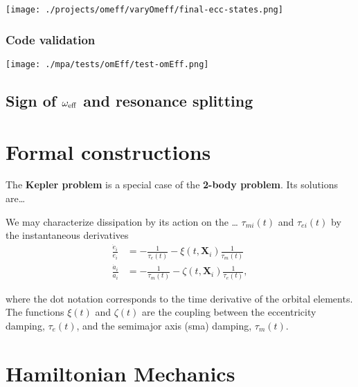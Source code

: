\documentclass[11pt]{article}
\begin{document}
\begin{center}
\texttt{[image: ./projects/omeff/varyOmeff/final-ecc-states.png]}
\end{center}

\subsubsection{Code validation}
\label{sec:org2dc94ff}
\begin{center}
\texttt{[image: ./mpa/tests/omEff/test-omEff.png]}
\end{center}


\subsection{Sign of \(\omega_{\rm eff}\) and resonance splitting}
\label{sec:org176ceb6}

\section{Formal constructions}
\label{sec:orgdb963f4}
The \textbf{Kepler problem} is a special case of the \textbf{2-body problem}.
Its solutions are\ldots{}

We may characterize dissipation by its action on the \ldots{}
\(\tau_{mi}(t)\) and \(\tau_{ei}(t)\) by the instantaneous derivatives
\begin{align}
   \frac{\dot e_i}{e_i} &= - \frac{1}{\tau_e(t)} - \xi(t, \mathbf X_i)\frac{1}{\tau_m(t)} \\
   \frac{\dot a_i}{a_i} &= -\frac{1}{\tau_m(t)} - \zeta(t, \mathbf X_i)\frac{1}{\tau_e(t)},
\end{align}
\noindent

\noindent
where the dot notation corresponds to the time derivative of the
orbital elements. The functions \(\xi(t)\) and \(\zeta(t)\) are the
coupling between the eccentricity damping, \(\tau_e(t)\), and the
semimajor axis (sma) damping, \(\tau_m(t)\).

\section{Hamiltonian Mechanics}
\label{sec:org13bb7ee}
\end{document}
